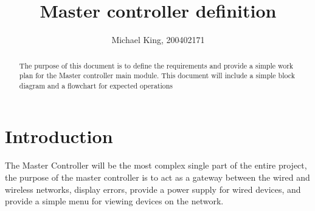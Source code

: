 \documentclass{article}
\begin{document}
	\begin{titlepage}
    	\title{Master controller definition}
    	\author{Michael King, 200402171}
    	\maketitle
    	\thispagestyle{empty}
	\end{titlepage}
    \begin{abstract}
        The purpose of this document is to define the requirements and provide a
         simple work plan for the Master controller main module. This document 
         will include a simple block diagram and a flowchart for expected 
         operations
         \newpage
	\end{abstract}
    \section{Introduction}
        The Master Controller will be the most complex single part of the entire
         project, the purpose of the master controller is to act as a gateway
         between the wired and wireless networks, display errors, provide a
         power supply for wired devices, and provide a simple menu for viewing 
         devices on the network.
     
\end{document}
